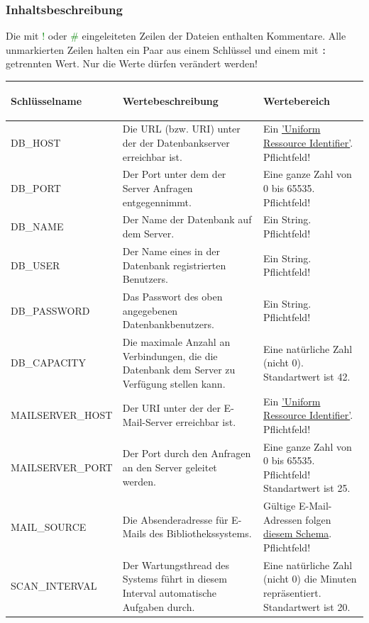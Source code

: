 \documentclass{article}
\begin{document}
\subsubsection{Inhaltsbeschreibung}
\hypertarget{propSchema}{}
Die mit \textcolor{green}{!} oder \textcolor{green}{\#} eingeleiteten Zeilen der Dateien enthalten Kommentare. Alle unmarkierten Zeilen halten ein Paar aus einem Schlüssel und einem mit \texttt{:} getrennten Wert. Nur die Werte dürfen verändert werden!

\begin{center}
\begin{table}[H]
\begin{tabular} {| m{4cm} | m{6cm} | m{5cm} |}
\hline
\hypertarget{configTabelle}{Schlüsselname} & Wertebeschreibung & Wertebereich \\
\hline
DB\_HOST & Die URL (bzw. URI) unter der der Datenbankserver erreichbar ist.& Ein \hyperlink{https://datatracker.ietf.org/doc/html/rfc3986}{'Uniform Ressource Identifier'}. Pflichtfeld!\\
\hline
DB\_PORT & Der Port unter dem der Server Anfragen entgegennimmt. & Eine ganze Zahl von 0 bis 65535. Pflichtfeld!\\
\hline
DB\_NAME & Der Name der Datenbank auf dem Server. & Ein String. Pflichtfeld!\\
\hline
DB\_USER & Der Name eines in der Datenbank registrierten Benutzers. & Ein String. Pflichtfeld!\\
\hline
DB\_PASSWORD & Das Passwort des oben angegebenen Datenbankbenutzers. & Ein String. Pflichtfeld!\\
\hline
DB\_CAPACITY & Die maximale Anzahl an Verbindungen, die die Datenbank dem Server zu Verfügung stellen kann. & Eine natürliche Zahl (nicht 0). Standartwert ist 42.\\
\hline
MAILSERVER\_HOST & Der URI unter der der E-Mail-Server erreichbar ist. &  Ein \hyperlink{https://datatracker.ietf.org/doc/html/rfc3986}{'Uniform Ressource Identifier'}. Pflichtfeld! \\
\hline
MAILSERVER\_PORT & Der Port durch den Anfragen an den Server geleitet werden. & Eine ganze Zahl von 0 bis 65535. Pflichtfeld! Standartwert ist 25. \\
\hline
MAIL\_SOURCE & Die Absenderadresse für E-Mails des Bibliothekssystems. & Gültige E-Mail-Adressen folgen \hyperlink{https://datatracker.ietf.org/doc/html/rfc5322}{diesem Schema}. Pflichtfeld!\\
\hline
SCAN\_INTERVAL & Der Wartungsthread des Systems führt in diesem Interval automatische Aufgaben durch. & Eine natürliche Zahl (nicht 0) die Minuten repräsentiert. Standartwert ist 20. \\

\end{tabular}
\end{table}
\end{center}
\end{document}
